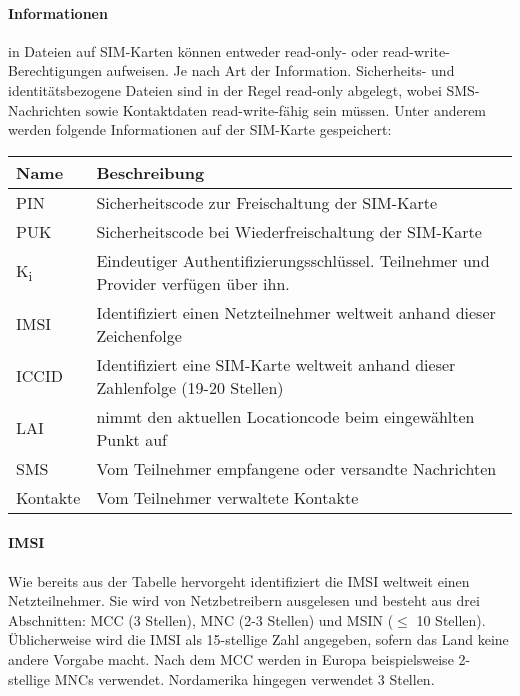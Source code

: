 \paragraph{Informationen} in Dateien auf SIM-Karten können entweder read-only- oder read-write-
Berechtigungen aufweisen. Je nach Art der Information. Sicherheits- und identitätsbezogene
Dateien sind in der Regel read-only abgelegt, wobei SMS-Nachrichten sowie Kontaktdaten
read-write-fähig sein müssen. Unter anderem werden folgende Informationen auf der SIM-Karte gespeichert:\vspace*{5mm}

    \begin{tabularx}{\textwidth}{|l|X|}
    \hline
      \textbf{Name} & \textbf{Beschreibung} \\
    \hline
    \hline
      \ac{PIN} & Sicherheitscode zur Freischaltung der SIM-Karte \\
    \hline
    \hline
          \ac{PUK} & Sicherheitscode bei Wiederfreischaltung der SIM-Karte \\
    \hline
    \hline
      K\textsubscript{i} & Eindeutiger Authentifizierungsschlüssel. Teilnehmer und Provider verfügen über ihn. \\
    \hline
    \hline
      \ac{IMSI} & Identifiziert einen Netzteilnehmer weltweit anhand dieser Zeichenfolge \\
    \hline
    \hline
      \ac{ICCID} & Identifiziert eine SIM-Karte weltweit anhand dieser Zahlenfolge (19-20 Stellen) \\
    \hline
    \hline
      \ac{LAI} & nimmt den aktuellen Locationcode beim eingewählten Punkt auf \\ 
    \hline
    \hline
      \ac{SMS} & Vom Teilnehmer empfangene oder versandte Nachrichten \\
    \hline
    \hline
      Kontakte & Vom Teilnehmer verwaltete Kontakte \\
    \hline
    \end{tabularx}
    \vspace*{5mm}

\paragraph{IMSI} Wie bereits aus der Tabelle hervorgeht identifiziert die \ac{IMSI} weltweit
einen Netzteilnehmer. Sie wird von Netzbetreibern ausgelesen und besteht aus drei Abschnitten:
\ac{MCC} (3 Stellen), \ac{MNC} (2-3 Stellen) und \ac{MSIN} ($\leq$ 10 Stellen).
Üblicherweise wird die \ac{IMSI} als 15-stellige Zahl angegeben, sofern das
Land keine andere Vorgabe macht. Nach dem \ac{MCC} werden in Europa beispielsweise 2-stellige \ac{MNC}s
verwendet. Nordamerika hingegen verwendet 3 Stellen. 

